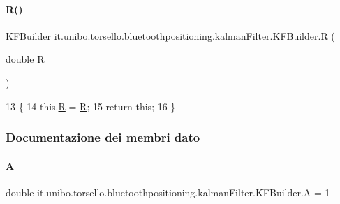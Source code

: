 \paragraph{\texorpdfstring{R()}{R()}}
{\footnotesize\ttfamily \hyperlink{classit_1_1unibo_1_1torsello_1_1bluetoothpositioning_1_1kalmanFilter_1_1KFBuilder}{K\+F\+Builder} it.\+unibo.\+torsello.\+bluetoothpositioning.\+kalman\+Filter.\+K\+F\+Builder.\+R (\begin{DoxyParamCaption}\item[{double}]{R }\end{DoxyParamCaption})}


\begin{DoxyCode}
13                                  \{
14         this.\hyperlink{classit_1_1unibo_1_1torsello_1_1bluetoothpositioning_1_1kalmanFilter_1_1KFBuilder_a7937e1ec71fbede97b0bd70ead2e30dd_a7937e1ec71fbede97b0bd70ead2e30dd}{R} = \hyperlink{classit_1_1unibo_1_1torsello_1_1bluetoothpositioning_1_1kalmanFilter_1_1KFBuilder_a7937e1ec71fbede97b0bd70ead2e30dd_a7937e1ec71fbede97b0bd70ead2e30dd}{R};
15         \textcolor{keywordflow}{return} \textcolor{keyword}{this};
16     \}
\end{DoxyCode}


\subsubsection{Documentazione dei membri dato}
\hypertarget{classit_1_1unibo_1_1torsello_1_1bluetoothpositioning_1_1kalmanFilter_1_1KFBuilder_a89f12916414e352fc820a2c82fde76b8_a89f12916414e352fc820a2c82fde76b8}{}\label{classit_1_1unibo_1_1torsello_1_1bluetoothpositioning_1_1kalmanFilter_1_1KFBuilder_a89f12916414e352fc820a2c82fde76b8_a89f12916414e352fc820a2c82fde76b8} 
\paragraph{\texorpdfstring{A}{A}}
{\footnotesize\ttfamily double it.\+unibo.\+torsello.\+bluetoothpositioning.\+kalman\+Filter.\+K\+F\+Builder.\+A = 1\hspace{0.3cm}{\ttfamily [private]}}

\hypertarget{classit_1_1unibo_1_1torsello_1_1bluetoothpositioning_1_1kalmanFilter_1_1KFBuilder_a0659c3648f664458d627741edf1de5a4_a0659c3648f664458d627741edf1de5a4}{}\label{classit_1_1unibo_1_1torsello_1_1bluetoothpositioning_1_1kalmanFilter_1_1KFBuilder_a0659c3648f664458d627741edf1de5a4_a0659c3648f664458d627741edf1de5a4} 
